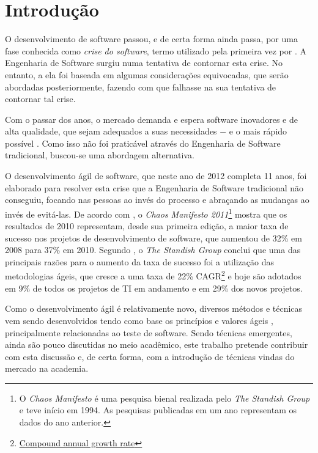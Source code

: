 \chapter{Introdução}

O desenvolvimento de software passou, e de certa forma ainda passa, por uma fase conhecida como \emph{crise do software}, termo utilizado pela primeira vez por . A Engenharia de Software surgiu \cite{NaurRandell} numa tentativa de contornar esta crise. No entanto, a ela foi baseada em algumas considerações equivocadas, que serão abordadas posteriormente, fazendo com que falhasse na sua tentativa de contornar tal crise.

Com o passar dos anos, o mercado demanda e espera software inovadores e de alta qualidade, que sejam adequados a suas necessidades $-$ e o mais rápido possível \cite{TheBusinessOfInnovation}. Como isso não foi praticável através do Engenharia de Software tradicional, buscou-se uma abordagem alternativa.

O desenvolvimento ágil de software, que neste ano de 2012 completa 11 anos, foi elaborado \cite{AgileManifesto} para resolver esta crise que a Engenharia de Software tradicional não conseguiu, focando nas pessoas ao invés do processo e abraçando as mudanças ao invés de evitá-las. De acordo com , o \textit{Chaos Manifesto 2011}\footnote{O \textit{Chaos Manifesto} é uma pesquisa bienal realizada pelo \textit{The Standish Group} e teve início em 1994. As pesquisas publicadas em um ano representam os dados do ano anterior.} mostra que os resultados de 2010 representam, desde sua primeira edição, a maior taxa de sucesso nos projetos de desenvolvimento de software, que aumentou de 32\% em 2008 para 37\% em 2010. Segundo , o \textit{The Standish Group} conclui que uma das principais razões para o aumento da taxa de sucesso foi a utilização das metodologias ágeis, que cresce a uma taxa de 22\% CAGR\footnote{\href{http://en.wikipedia.org/wiki/Compound_annual_growth_rate} {Compound annual growth rate}} e hoje são adotados em 9\% de todos os projetos de TI em andamento e em 29\% dos novos projetos.

Como o desenvolvimento ágil é relativamente novo, diversos métodos e técnicas vem sendo desenvolvidos tendo como base os princípios e valores ágeis \cite{BDDRodrigo}, principalmente relacionadas ao teste de software. Sendo técnicas emergentes, ainda são pouco discutidas no meio acadêmico, este trabalho pretende contribuir com esta discussão e, de certa forma, com a introdução de técnicas vindas do mercado na academia.


